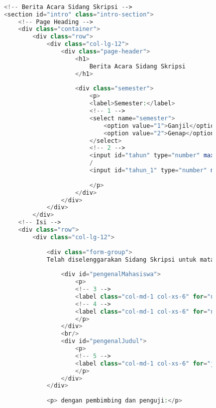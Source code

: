 \begin{lstlisting}[language=PHP,basicstyle=\tiny,caption=skripsi.php]
			
			
			<!-- Berita Acara Sidang Skripsi -->
			<section id="intro" class="intro-section">
				<!-- Page Heading -->
				<div class="container">
					<div class="row">
						<div class="col-lg-12">
							<div class="page-header">
								<h1>
									Berita Acara Sidang Skripsi
								</h1>
							
								<div class="semester">
									<p> 
									<label>Semester:</label>
									<!-- 1 -->
									<select name="semester">
										<option value="1">Ganjil</option>
										<option value="2">Genap</option>
									</select>
									<!-- 2 -->
									<input id="tahun" type="number" max="9999" ng-model="tahun" name="tahun"/>
									/
									<input id="tahun_1" type="number" max="9999" value="{{tahun + 1}}" disabled="disabled"/>
									
									</p>
								</div>
							</div>
						</div>
					</div>
				<!-- Isi -->
				<div class="row">
					<div class="col-lg-12">
					
						<div class="form-group">
						Telah diselenggarakan Sidang Skripsi untuk mata kuliah AIF402-6 Skripsi 2 bagi:
						
							<div id="pengenalMahasiswa">
								<p>
								<!-- 3 -->
								<label class="col-md-1 col-xs-6" for="npm">NPM:</label><input minlength="10" id="npm" class="inline-form col-md-3 col-xs-6" ng-model="n_npm" name="npm" required />
								<!-- 4 -->
								<label class="col-md-1 col-xs-6" for="nama">Nama:</label><input id="nama" class="inline-form col-md-7 col-xs-6" name="nama"/>
								</p>
							</div>
							<br/>
							<div id="pengenalJudul">
								<p>
								<!-- 5 -->
								<label class="col-md-1 col-xs-6" for="judul">Judul:</label><input id="judul" class="inline-form col-md-11 col-xs-6" name="judul"/>
								</p>
							</div>
						</div>
					
						<p> dengan pembimbing dan penguji:</p>
					

\end{lstlisting}
